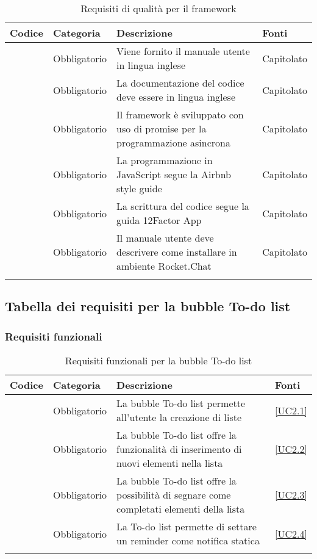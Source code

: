 \begin{longtable}{|P{1.5cm}|P{2.5cm}|P{6.5cm}|P{2.5cm}|}
	\hline \textbf{Codice} & \textbf{Categoria} & \textbf{Descrizione} & \textbf{Fonti} \\
	\hline \RequisitoObQ\label{L57} & Obbligatorio & Viene fornito il manuale utente in lingua inglese & Capitolato \\
	\hline \RequisitoObQ\label{L66} & Obbligatorio & La documentazione del codice deve essere in lingua inglese & Capitolato \\
	\hline \RequisitoObQ\label{L58} & Obbligatorio & Il framework è sviluppato con uso di promise per la programmazione asincrona & Capitolato \\
	\hline \RequisitoObQ\label{L59} & Obbligatorio & La programmazione in JavaScript segue la Airbnb style guide & Capitolato \\
	\hline \RequisitoObQ\label{L60} & Obbligatorio & La scrittura del codice segue la guida 12Factor App & Capitolato \\
	\hline \RequisitoObQ\label{L67} & Obbligatorio & Il manuale utente deve descrivere come installare \ProjectName{} in ambiente Rocket.Chat & Capitolato \\
	\hline
\caption{Requisiti di qualità per il framework}
\end{longtable}


\subsection{Tabella dei requisiti per la bubble To-do list}

\subsubsection{Requisiti funzionali}

\begin{longtable}{|P{1.5cm}|P{2.5cm}|P{6.5cm}|P{2.5cm}|}
	\hline \textbf{Codice} & \textbf{Categoria} & \textbf{Descrizione} & \textbf{Fonti} \\
	\hline \RequisitoObF\label{L17} & Obbligatorio & La bubble To-do list permette all'utente la creazione di liste & \ref{UC2.1} \\
	\hline \RequisitoObF\label{L18} & Obbligatorio & La bubble To-do list offre la funzionalità di inserimento di nuovi elementi nella lista & \ref{UC2.2} \\
	\hline \RequisitoObF\label{L19} & Obbligatorio & La bubble To-do list offre la possibilità di segnare come completati elementi della lista & \ref{UC2.3} \\
	\hline \RequisitoObF\label{L20} & Obbligatorio & La To-do list permette di settare un reminder come notifica statica & \ref{UC2.4} \\
	\hline
	\caption{Requisiti funzionali per la bubble To-do list}
\end{longtable}

